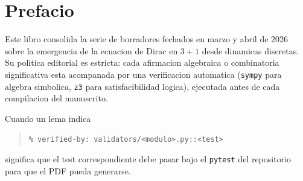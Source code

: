 \chapter*{Prefacio}

Este libro consolida la serie de borradores fechados en marzo y abril de 2026
sobre la emergencia de la ecuacion de Dirac en $3+1$ desde dinamicas
discretas. Su politica editorial es estricta: cada afirmacion algebraica o
combinatoria significativa esta acompanada por una verificacion automatica
(\texttt{sympy} para algebra simbolica, \texttt{z3} para satisfacibilidad
logica), ejecutada antes de cada compilacion del manuscrito.

Cuando un lema indica
\begin{quote}\small\texttt{\% verified-by: validators/<modulo>.py::<test>}\end{quote}
significa que el test correspondiente debe pasar bajo el \texttt{pytest} del
repositorio para que el PDF pueda generarse.
